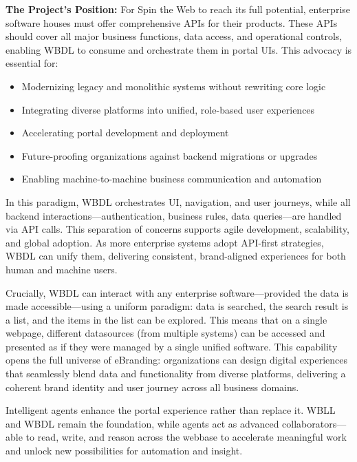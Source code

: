 \textbf{The Project's Position:} For Spin the Web to reach its full potential, enterprise software houses must offer comprehensive APIs for their products. These APIs should cover all major business functions, data access, and operational controls, enabling WBDL to consume and orchestrate them in portal UIs. This advocacy is essential for:
\begin{itemize}
	\item Modernizing legacy and monolithic systems without rewriting core logic
	\item Integrating diverse platforms into unified, role-based user experiences
	\item Accelerating portal development and deployment
	\item Future-proofing organizations against backend migrations or upgrades
	\item Enabling machine-to-machine business communication and automation
\end{itemize}

In this paradigm, WBDL orchestrates UI, navigation, and user journeys, while all backend interactions—authentication, business rules, data queries—are handled via API calls. This separation of concerns supports agile development, scalability, and global adoption. As more enterprise systems adopt API-first strategies, WBDL can unify them, delivering consistent, brand-aligned experiences for both human and machine users.

Crucially, WBDL can interact with any enterprise software—provided the data is made accessible—using a uniform paradigm: data is searched, the search result is a list, and the items in the list can be explored. This means that on a single webpage, different datasources (from multiple systems) can be accessed and presented as if they were managed by a single unified software. This capability opens the full universe of eBranding: organizations can design digital experiences that seamlessly blend data and functionality from diverse platforms, delivering a coherent brand identity and user journey across all business domains.

Intelligent agents enhance the portal experience rather than replace it. WBLL and WBDL remain the foundation, while agents act as advanced collaborators—able to read, write, and reason across the webbase to accelerate meaningful work and unlock new possibilities for automation and insight.
